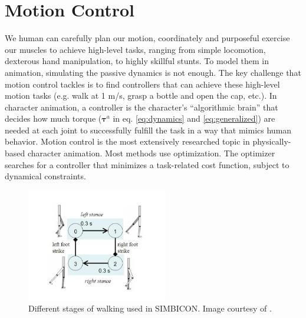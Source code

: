 \section{Motion Control}
We human can carefully plan our motion, coordinately and purposeful exercise our muscles to achieve high-level tasks, ranging from simple locomotion, dexterous hand manipulation, to highly skillful stunts. To model them in animation, simulating the passive dynamics is not enough. The key challenge that motion control tackles is to find controllers that can achieve these high-level motion tasks (e.g. walk at 1 m/s, grasp a bottle and open the cap, etc.). In character animation, a controller is the character's ``algorithmic brain'' that decides how much torque ($\boldsymbol{\tau}^a$ in eq. \ref{eq:dynamics} and \ref{eq:generalized}) are needed at each joint to successfully fulfill the task in a way that mimics human behavior. Motion control is the most extensively researched topic in physically-based character animation. Most methods use optimization. The optimizer searches for a controller that minimizes a task-related cost function, subject to dynamical constraints.

\begin{figure}[h]
  \centering
  \includegraphics[width=0.55\textwidth]{figures/stateMachine.jpg}
  \caption{Different stages of walking used in SIMBICON. Image courtesy of \cite{Yin:2007:SIM}.}
  \label{fig:stateMachine}
\end{figure}

